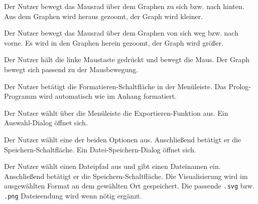 \documentclass[parskip=full,11pt,twoside]{scrartcl}
\begin{document}


{Der Nutzer bewegt das Mausrad über dem Graphen zu sich bzw. nach hinten.}
{Aus dem Graphen wird heraus gezoomt, der Graph wird kleiner.}

{Der Nutzer bewegt das Mausrad über dem Graphen von sich weg bzw. nach vorne.}
{Es wird in den Graphen herein gezoomt, der Graph wird größer.}



{Der Nutzer hält die linke Maustaste gedrückt und bewegt die Maus.}
{Der Graph bewegt sich passend zu der Mausbewegung.}



{Der Nutzer betätigt die Formatieren-Schaltfläche in der Menüleiste.}
{Das Prolog-Programm wird automatisch wie im Anhang formatiert.}



{Der Nutzer wählt über die Menüleiste die Exportieren-Funktion aus.}
{Ein Auswahl-Dialog öffnet sich.}

{Der Nutzer wählt eine der beiden Optionen aus. Anschließend betätigt er die Speichern-Schaltfläche.}
{Ein Datei-Speichern-Dialog öffnet sich.}

{Der Nutzer wählt einen Dateipfad aus und gibt einen Dateinamen ein. Anschließend betätigt er die Speichern-Schaltfläche.}
{Die Visualisierung wird im ausgewählten Format an dem gewählten Ort gespeichert. Die passende \texttt{.svg} bzw. \texttt{.png} Dateieendung wird wenn nötig ergänzt.}
\end{document}
